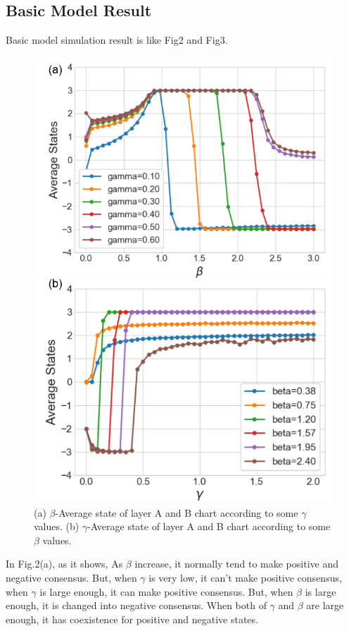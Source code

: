 \documentclass[english]{cccconf}
\begin{document}
\subsection{Basic Model Result}
Basic model simulation result is like Fig2 and Fig3.
\begin{figure}[!htb]
  \centering
  \includegraphics[width=\hsize]{FIG2.png}
  \caption{(a) $\beta$-Average state of layer A and B chart according to some $\gamma$ values. (b) $\gamma$-Average state of layer A and B chart according to some $\beta$ values.}
  \label{Fig2}
\end{figure}

In Fig.2(a), as it shows, As $\beta$ increase, it normally tend to make positive and negative consensus. But, when $\gamma$ is very low, it can’t make positive consensus, when $\gamma$ is large enough, it can make positive consensus. But, when $\beta$ is large enough, it is changed into negative consensus. When both of $\gamma$ and $\beta$ are large enough, it has coexistence for positive and negative states.
\end{document}
